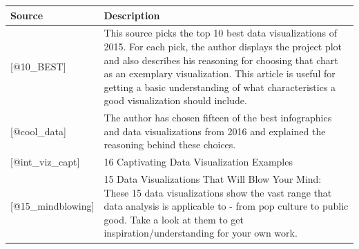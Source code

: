 \documentclass[]{book}
\theoremstyle{definition}
\theoremstyle{definition}
\theoremstyle{definition}
\theoremstyle{remark}
\begin{document}
\begin{longtable}[]{@{}ll@{}}
\toprule
\begin{minipage}[b]{0.15\columnwidth}\raggedright\strut
\textbf{Source}\strut
\end{minipage} & \begin{minipage}[b]{0.79\columnwidth}\raggedright\strut
\textbf{Description}\strut
\end{minipage}\tabularnewline
\midrule
\endhead
\begin{minipage}[t]{0.15\columnwidth}\raggedright\strut
{[}@10\_BEST{]}\strut
\end{minipage} & \begin{minipage}[t]{0.79\columnwidth}\raggedright\strut
This source picks the top 10 best data visualizations of 2015. For each
pick, the author displays the project plot and also describes his
reasoning for choosing that chart as an exemplary visualization. This
article is useful for getting a basic understanding of what
characteristics a good visualization should include.\strut
\end{minipage}\tabularnewline
\begin{minipage}[t]{0.15\columnwidth}\raggedright\strut
{[}@cool\_data{]}\strut
\end{minipage} & \begin{minipage}[t]{0.79\columnwidth}\raggedright\strut
The author has chosen fifteen of the best infographics and data
visualizations from 2016 and explained the reasoning behind these
choices.\strut
\end{minipage}\tabularnewline
\begin{minipage}[t]{0.15\columnwidth}\raggedright\strut
{[}@int\_viz\_capt{]}\strut
\end{minipage} & \begin{minipage}[t]{0.79\columnwidth}\raggedright\strut
16 Captivating Data Visualization Examples\strut
\end{minipage}\tabularnewline
\begin{minipage}[t]{0.15\columnwidth}\raggedright\strut
{[}@15\_mindblowing{]}\strut
\end{minipage} & \begin{minipage}[t]{0.79\columnwidth}\raggedright\strut
15 Data Visualizations That Will Blow Your Mind: These 15 data
visualizations show the vast range that data analysis is applicable to -
from pop culture to public good. Take a look at them to get
inspiration/understanding for your own work.\strut
\end{minipage}\tabularnewline

\end{longtable}
\end{document}
